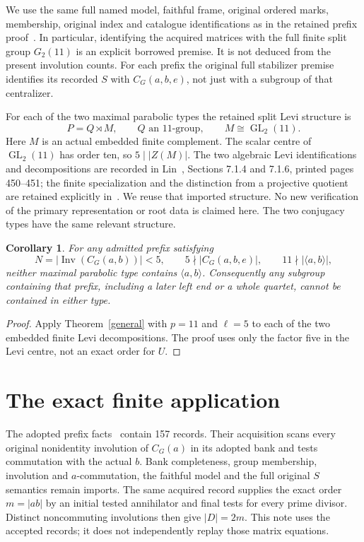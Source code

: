 \documentclass[11pt]{article}
\newtheorem{corollary}[lemma]{Corollary}
\theoremstyle{remark}\newtheorem{remark}[lemma]{Remark}
\newcommand{\Inv}{\operatorname{Inv}}
\newcommand{\gen}[1]{\langle #1\rangle}
\newcommand{\GL}{\operatorname{GL}}
\begin{document}
We use the same full named model, faithful frame, original ordered marks,
membership, original index and catalogue identifications as in the
retained prefix proof~\cite{old}. In particular, identifying the acquired
matrices with the full finite split group $G_2(11)$ is an explicit
borrowed premise. It is not deduced from the present involution counts.
For each prefix the original full stabilizer premise identifies its
recorded $S$ with $C_G(a,b,e)$, not just with a subgroup of that centralizer.

For each of the two maximal parabolic types the retained split Levi
structure is
\[
 P=Q\rtimes M,\qquad Q\text{ an }11\text{-group},\qquad
 M\cong\GL_2(11).
\]
Here $M$ is an actual embedded finite complement. The scalar centre of
$\GL_2(11)$ has order ten, so $5\mid |Z(M)|$.
The two algebraic Levi identifications and decompositions are recorded
in Lin~\cite{Lin}, Sections 7.1.4 and 7.1.6, printed pages 450--451;
the finite specialization and the distinction from a projective quotient
are retained explicitly in~\cite{old}. We reuse that imported structure.
No new verification of the primary representation or root data is
claimed here. The two conjugacy types have the same relevant structure.

\begin{corollary}\label{q11}
For any admitted prefix satisfying
\[
 N=|\Inv(C_G(a,b))|<5,\qquad
 5\nmid |C_G(a,b,e)|,\qquad 11\nmid |\gen{a,b}|,
\]
neither maximal parabolic type contains $\gen{a,b}$.
Consequently any subgroup containing that prefix, including a later
left end or a whole quartet, cannot be contained in either type.
\end{corollary}
\begin{proof}
Apply Theorem~\ref{general} with $p=11$ and $\ell=5$ to each of
the two embedded finite Levi decompositions. The proof uses only the
factor five in the Levi centre, not an exact order for $U$.
\end{proof}

\section{The exact finite application}

The adopted prefix facts~\cite{facts} contain 157 records. Their
acquisition scans every original nonidentity involution of $C_G(a)$
in its adopted bank and tests commutation with the actual $b$.
Bank completeness, group membership, involution and $a$-commutation,
the faithful model and the full original $S$ semantics remain imports.
The same acquired record supplies the exact order $m=|ab|$ by an
initial tested annihilator and final tests for every prime divisor.
Distinct noncommuting involutions then give $|D|=2m$.
This note uses the accepted records; it does not independently replay
those matrix equations.
\end{document}

